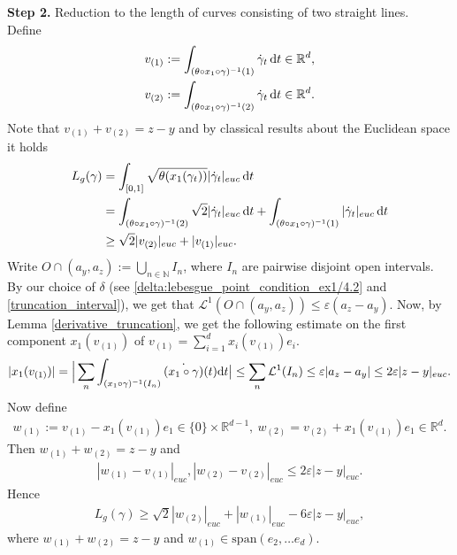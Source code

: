 \documentclass[a4paper,10pt]{article}
\numberwithin{equation}{section}
\newcommand{\R}{\mathbb{R}}
\newcommand{\N}{\mathbb{N}}
\newcommand{\e}{\varepsilon}
\newcommand{\di}{{\rm d}}
\begin{document}
\textbf{Step 2.} Reduction to the length of curves consisting of two straight lines. \\
Define
\begin{align*}
    &v_{(1)}:= \int_{(\theta \circ x_1 \circ \gamma)^{-1}(1)}\dot{\gamma}_t \, \di t \in \R^d,\\
    &v_{(2)}:= \int_{(\theta \circ x_1 \circ \gamma)^{-1}(2)}\dot{\gamma}_t \, \di t \in \R^d.
\end{align*}
Note that $v_{(1)} + v_{(2)} = {z}-y$ and by classical results about the Euclidean space it holds  
\begin{align}\label{estimate_length_of_tilde_gamma_2}
    L_g({\gamma}) &= \int_{[0,1]} \sqrt{\theta(x_1({\gamma}_t))} |\dot{\gamma}_t|_{euc} \, \di t \nonumber\\
    & = \int_{(\theta \circ x_1 \circ \gamma)^{-1}(2)} \sqrt{2}|\dot{\gamma}_t|_{euc} \, \di t + \int_{(\theta \circ x_1 \circ \gamma)^{-1}(1)}|\dot{\gamma}_t|_{euc} \, \di t  \nonumber\\
    & \geq \sqrt{2}|v_{(2)}|_{euc} + |v_{(1)}|_{euc}. 
\end{align}
Write $O \cap (a_y, a_{z}):= \bigcup_{n\in \N} I_n$, where $I_n$ are pairwise disjoint open intervals. By our choice of $\delta$ (see \eqref{delta:lebesgue_point_condition_ex1/4.2} and \eqref{truncation_interval}), we get that $\mathcal{L}^1(O \cap (a_y, a_{z})) \leq \e(a_{z}-a_y)$.
Now, by Lemma \ref{derivative_truncation}, we get the following estimate on the first component $x_1(v_{(1)})$ of $v_{(1)} = \sum_{i=1}^d x_i(v_{(1)}) e_i$. 
\begin{align*}
    |x_1(v_{(1)}) |=\Big| \sum_n \int_{(x_1 \circ \gamma)^{-1}(I_n)} \dot{(x_1 \circ \gamma)}(t) \di t \big| \leq \sum_n \mathcal{L}^1(I_n) \leq \e|a_{z}-a_y| \leq 2\e|z-y|_{euc}.
\end{align*}
Now define 
\begin{align*}
    w_{(1)}:= v_{(1)}- x_1(v_{(1)}) e_1 \in \{0\} \times \R^{d-1}, \ w_{(2)} = v_{(2)}+ x_1(v_{(1)}) e_1 \in \R^d. 
\end{align*}
Then $w_{(1)}+w_{(2)}= z-y$ and 
\begin{align*}
    |w_{(1)}-v_{(1)}|_{euc}, |w_{(2)}-v_{(2)}|_{euc} \leq 2\e|z-y|_{euc}. 
\end{align*}
Hence 
\begin{align}\label{length_estimate_w_vectors}
     L_g({\gamma}) \geq \sqrt{2}|w_{(2)}|_{euc} + |w_{(1)}|_{euc}- 6\e|z-y|_{euc},
\end{align}
where $w_{(1)}+w_{(2)}= z-y$ and $w_{(1)} \in \mathrm{span}(e_2, \ldots e_d)$. 
\end{document}
